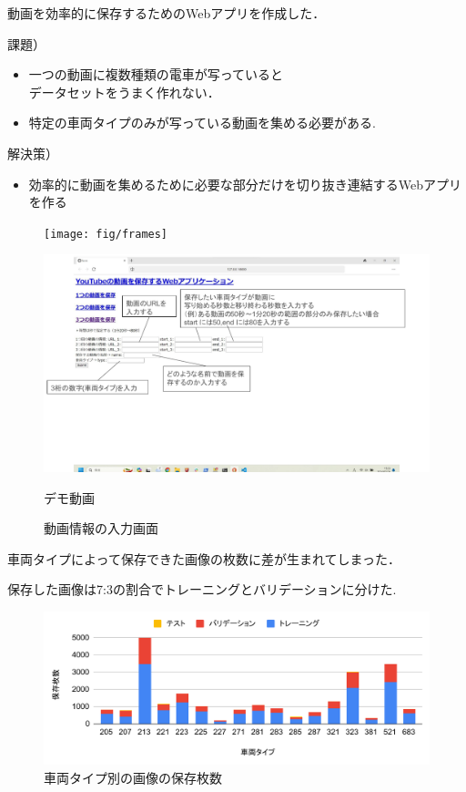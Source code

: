 動画を効率的に保存するためのWebアプリを作成した．

課題）
\begin{itemize}
	\item 一つの動画に複数種類の電車が写っていると\\データセットをうまく作れない．
	\item 特定の車両タイプのみが写っている動画を集める必要がある.
\end{itemize}
解決策）
\begin{itemize}	
	\item 効率的に動画を集めるために必要な部分だけを切り抜き連結するWebアプリを作る
\end{itemize}
	
\newpage
\begin{figure}
	\centering
	\texttt{[image: fig/frames]}
	\label{fig:frames}
\end{figure}


\newpage

\begin{figure}[htbp]

			\centering
			\includegraphics[width=0.75\linewidth]{../paper/chap3/fig/django}
			\label{fig:django}
			\caption{動画情報の入力画面}
			デモ動画\href{run:./fig/demo1.mp4}{\textcolor[hsb]{0.0, 0.7, 1.0}{\faPlayCircle[regular]}} 	

\end{figure}



\newpage

車両タイプによって保存できた画像の枚数に差が生まれてしまった．

保存した画像は7:3の割合でトレーニングとバリデーションに分けた.
\begin{figure}
	\centering
	\includegraphics[width=0.8\linewidth]{fig/chart2}
	\caption{車両タイプ別の画像の保存枚数}
	\label{fig:chart2}
\end{figure}



